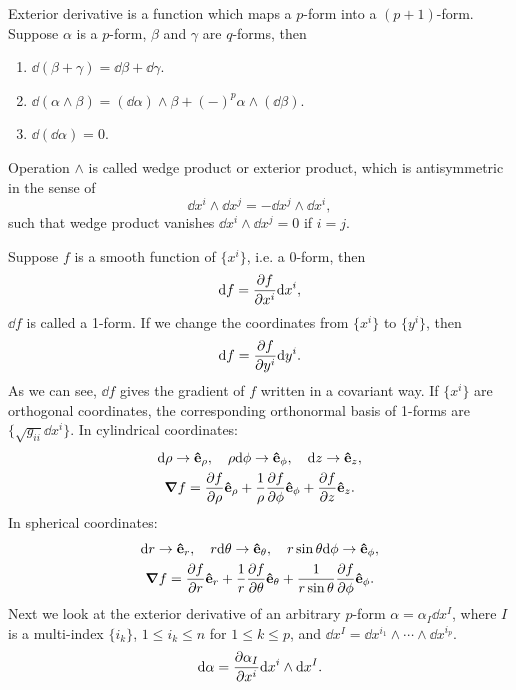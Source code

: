 \documentclass[10pt]{article}
\begin{document}
	\begin{definition}
		Exterior derivative is a function which maps a $p$-form into a $(p+1)$-form. Suppose $\alpha$ is a $p$-form, $\beta$ and $\gamma$ are $q$-forms, then
		\begin{enumerate}
			\item $\dd (\beta + \gamma) = \dd \beta + \dd \gamma$.
			\item $\dd (\alpha \wedge \beta) = (\dd \alpha) \wedge \beta + (-)^{p} \alpha \wedge (\dd \beta)$.
			\item $\dd (\dd \alpha) = 0$.
		\end{enumerate}
		Operation $\wedge$ is called wedge product or exterior product, which is antisymmetric in the sense of
		\begin{equation}
			\dd x^i \wedge \dd x^j = - \dd x^j \wedge \dd x^i,
		\end{equation}
		such that wedge product vanishes $\dd x^i \wedge \dd x^j = 0$ if $i = j$.
	\end{definition}

	Suppose $f$ is a smooth function of $\{ x^i \}$, i.e. a 0-form, then
	\begin{equation}
		\dd f = \pdv{f}{x^i} \dd x^i,
	\end{equation}
	$\dd f$ is called a 1-form. If we change the coordinates from $\{ x^i \}$ to $\{ y^i \}$, then
	\begin{equation}
		\dd f = \pdv{f}{y^i} \dd y^i.
	\end{equation}
	As we can see, $\dd f$ gives the gradient of $f$ written in a covariant way. If $\{ x^i \}$ are orthogonal coordinates, the corresponding orthonormal basis of 1-forms are $\{\sqrt{g_{ii}} \dd x^i \}$.
	In cylindrical coordinates:
	\begin{gather}
		\dd \rho \to \vu{e}_{\rho}, \quad \rho \dd \phi \to \vu{e}_{\phi}, \quad \dd z \to \vu{e}_{z}, \\
		\grad{f} = \pdv{f}{\rho} \vu{e}_{\rho} + \frac{1}{\rho}\pdv{f}{\phi} \vu{e}_{\phi} + \pdv{f}{z} \vu{e}_z.
	\end{gather}
	In spherical coordinates:
	\begin{gather}
		\dd r \to \vu{e}_r, \quad r \dd \theta \to \vu{e}_{\theta}, \quad r \sin \theta \dd \phi \to \vu{e}_{\phi}, \\
		\grad{f} = \pdv{f}{r} \vu{e}_r + \frac{1}{r}\pdv{f}{\theta} \vu{e}_{\theta} + \frac{1}{r \sin \theta} \pdv{f}{\phi} \vu{e}_{\phi}.
	\end{gather}
	Next we look at the exterior derivative of an arbitrary $p$-form $\alpha = \alpha_I \dd x^I$, where $I$ is a multi-index $\{ i_k \}$, $1 \le i_k \le n$ for $1 \le k \le p$, and $\dd x^I = \dd x^{i_1} \wedge \cdots \wedge \dd x^{i_p}$.
	\begin{equation}
		\dd \alpha = \pdv{\alpha_I}{x^i} \dd x^i \wedge \dd x^I.
	\end{equation}
\end{document}
